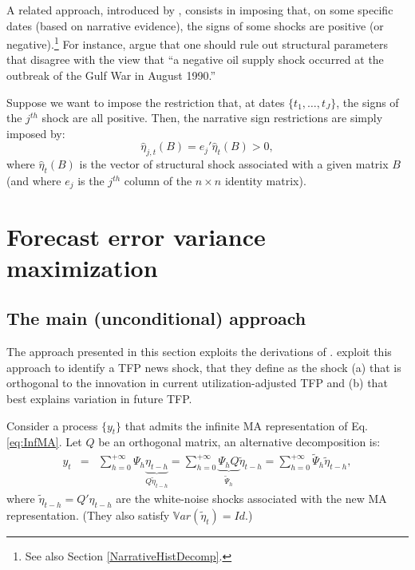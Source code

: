 \documentclass[
  12pt,
]{book}
\theoremstyle{definition}
\theoremstyle{definition}
\theoremstyle{definition}
\theoremstyle{definition}
\theoremstyle{remark}
\begin{document}
A related approach, introduced by \citet{AntolinDiaz_RubioRamirez_2018}, consists in imposing that, on some specific dates (based on narrative evidence), the signs of some shocks are positive (or negative).\footnote{See also Section \ref{NarrativeHistDecomp}.} For instance, \citet{AntolinDiaz_RubioRamirez_2018} argue that one should rule out structural parameters that disagree with the view that ``a negative oil supply shock occurred at the outbreak of the Gulf War in August 1990.''

Suppose we want to impose the restriction that, at dates \(\{t_1,\dots,t_J\}\), the signs of the \(j^{th}\) shock are all positive. Then, the narrative sign restrictions are simply imposed by:
\[
\hat{\eta}_{j,t}(B) = e_j'\hat\eta_{t}(B) > 0,
\]
where \(\hat\eta_{t}(B)\) is the vector of structural shock associated with a given matrix \(B\) (and where \(e_j\) is the \(j^{th}\) column of the \(n \times n\) identity matrix).

\hypertarget{forecast-error-variance-maximization}{%
\chapter{Forecast error variance maximization}\label{forecast-error-variance-maximization}}

\hypertarget{the-main-unconditional-approach}{%
\section{The main (unconditional) approach}\label{the-main-unconditional-approach}}

The approach presented in this section exploits the derivations of \citet{Uhlig_2004}. \citet{BARSKY2011273} exploit this approach to identify a TFP news shock, that they define as the shock (a) that is orthogonal to the innovation in current utilization-adjusted TFP and (b) that best explains variation in future TFP.

Consider a process \(\{y_t\}\) that admits the infinite MA representation of Eq. \eqref{eq:InfMA}. Let \(Q\) be an orthogonal matrix, an alternative decomposition is:
\begin{eqnarray}
y_t&=&\sum_{h=0}^{+\infty}\Psi_h\underbrace{\eta_{t-h}}_{Q\tilde \eta_{t-h}} = \sum_{h=0}^{+\infty}\underbrace{\Psi_hQ}_{\tilde\Psi_h}\tilde
\eta_{t-h} = \sum_{h=0}^{+\infty}\tilde\Psi_h\tilde \eta_{t-h},
\end{eqnarray}
where \(\tilde \eta_{t-h}=Q'\eta_{t-h}\) are the white-noise shocks associated with the new MA representation. (They also satisfy \(\mathbb{V}ar(\tilde\eta_t)=Id\).)
\end{document}

